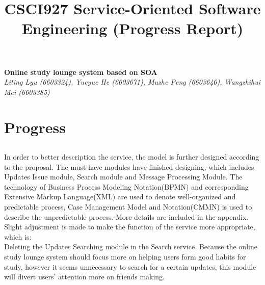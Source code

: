 \documentclass[runningheads]{llncs}
\begin{document}
\title{\large{CSCI927 Service-Oriented Software Engineering (Progress Report)}}
\author{}
\institute{}
\maketitle
\vspace{-1cm}



\begin{center}
\Large{\textbf{Online study lounge system based on SOA}} \\ %
\vspace{0.2cm}
\large{\emph{ Liting Lyu (6603324), Yueyue  He (6603671), Muzhe Peng (6603646), Wangzhihui Mei (6603385)}}\\%
\vspace{0.3cm}
\end{center}

\noindent %
\section*{Progress}
\subsection*{}
In order to better description the service, the model is further designed according to the proposal. The must-have modules have finished designing, which includes Updates Issue module, Search module and Message Processing Module. The technology of Business Process Modeling Notation(BPMN) and corresponding Extensive Markup Language(XML) are used to denote well-organized and predictable process, Case Management Model and Notation(CMMN) is used to describe the unpredictable process. More details are included in the appendix. 
\\Slight adjustment is made to make the function of the service more appropriate, which is:
\\Deleting the Updates Searching module in the Search service. Because the online study lounge system should focus more on helping users form good habits for study, however it seems unnecessary to search for a certain updates, this module will divert users’ attention more on friends making. 
\end{document}
